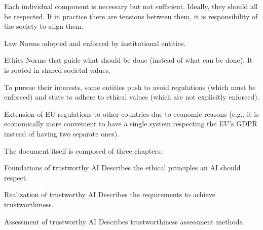 \begin{remark}
    Each individual component is necessary but not sufficient. Ideally, they should all be respected. If in practice there are tensions between them, it is responsibility of the society to align them.
\end{remark}

\begin{remark}
    \phantom{}
    \begin{descriptionlist}
        \item[Law]  
            Norms adopted and enforced by institutional entities.
        
        \item[Ethics]  
            Norms that guide what should be done (instead of what can be done). It is rooted in shared societal values.
    \end{descriptionlist}

    \indenttbox
    \begin{example}
        To pursue their interests, some entities push to avoid regulations (which must be enforced) and state to adhere to ethical values (which are not explicitly enforced).
    \end{example}
    
    \indenttbox
    \begin{example}
        Extension of EU regulations to other countries due to economic reasons (e.g., it is economically more convenient to have a single system respecting the EU's GDPR instead of having two separate ones).
    \end{example}
\end{remark}

The document itself is composed of three chapters:
\begin{descriptionlist}
    \item[Foundations of trustworthy AI]
        Describes the ethical principles an AI should respect.

    \item[Realization of trustworthy AI] 
        Describes the requirements to achieve trustworthiness.

    \item[Assessment of trustworthy AI] 
        Describes trustworthiness assessment methods.
\end{descriptionlist}

